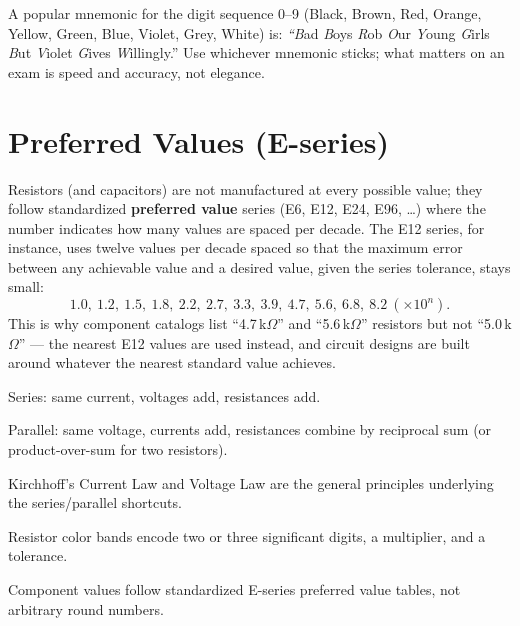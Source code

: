 \begin{examtip}
A popular mnemonic for the digit sequence 0--9 (Black, Brown, Red,
Orange, Yellow, Green, Blue, Violet, Grey, White) is: \emph{``B}ad
\emph{B}oys \emph{R}ob \emph{O}ur \emph{Y}oung \emph{G}irls \emph{B}ut
\emph{V}iolet \emph{G}ives \emph{W}illingly.'' Use whichever mnemonic
sticks; what matters on an exam is speed and accuracy, not elegance.
\end{examtip}

\section{Preferred Values (E-series)}

Resistors (and capacitors) are not manufactured at every possible value;
they follow standardized \textbf{preferred value} series (E6, E12, E24,
E96, \dots) where the number indicates how many values are spaced
per decade. The E12 series, for instance, uses twelve values per decade
spaced so that the maximum error between any achievable value and a
desired value, given the series tolerance, stays small:
\[
1.0,\ 1.2,\ 1.5,\ 1.8,\ 2.2,\ 2.7,\ 3.3,\ 3.9,\ 4.7,\ 5.6,\ 6.8,\ 8.2 \ (\times 10^{n}).
\]
This is why component catalogs list ``4.7\,k$\Omega$'' and
``5.6\,k$\Omega$'' resistors but not ``5.0\,k$\Omega$'' --- the nearest
E12 values are used instead, and circuit designs are built around
whatever the nearest standard value achieves.

\begin{quickreview}
\item Series: same current, voltages add, resistances add.
\item Parallel: same voltage, currents add, resistances combine by
reciprocal sum (or product-over-sum for two resistors).
\item Kirchhoff's Current Law and Voltage Law are the general principles
underlying the series/parallel shortcuts.
\item Resistor color bands encode two or three significant digits, a
multiplier, and a tolerance.
\item Component values follow standardized E-series preferred value
tables, not arbitrary round numbers.
\end{quickreview}

